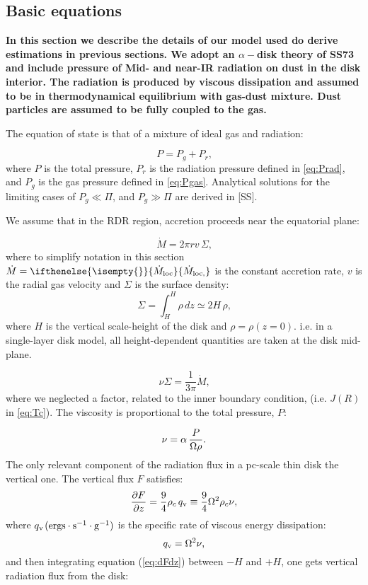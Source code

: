 \documentclass[12pt,english,preprint]{aastex}
\newcommand{\mybf}{\bf}
\newcommand{\su}[2]{#1_{\rm #2}}
\newcommand{\mdt}[1][]{ 
  \ifthenelse{\isempty{#1}}
  {\dot{M}_{\rm loc}}
  { {\dot M}_{\rm{loc},{#1}} } 
  } %
\begin{document}
\subsection{Basic equations}
{\mybf
In this section we describe the details of our model used do derive estimations 
in previous sections. 
We adopt an $\alpha-$disk theory of SS73 and include pressure of Mid- and near-IR radiation on dust in the disk 
interior. The radiation is produced by viscous dissipation and assumed to be in thermodynamical 
equilibrium with gas-dust mixture. Dust particles are assumed to be fully coupled to the gas. 

The equation of state is that of a mixture of ideal gas and radiation:

\begin{equation}
P=P_{g}+P_r\mbox{,}\label{eq:Ptot}
\end{equation}
where $P$ is the total pressure, $P_r$ is the radiation pressure defined 
in \eqref{eq:Prad}, and  $P_{g}$ is the gas pressure defined in \eqref{eq:Pgas}.
Analytical solutions for the
limiting cases of $P_{g}\ll\Pi$, and $P_{g}\gg\Pi$ are derived in
{[}SS{]}.

We assume that in the RDR region, accretion proceeds near the equatorial plane:
}
\begin{equation}
\dot{M}=2\pi rv\,\Sigma\mbox{,}\label{eq:MdotEq}
\end{equation}
where to simplify notation in this section $\dot{M}=\mdt$ is the constant accretion rate, $v$ is the radial
gas velocity and $\Sigma$ is the surface density: 
\begin{equation}
\Sigma=\int_H^H\rho\,dz\simeq2 H\,\rho\mbox{,}\label{eq:SigmaS}
\end{equation}
where $H$ is the vertical scale-height of the disk and $\rho=\rho(z=0)$.
i.e. in a single-layer disk model, all height-dependent quantities are taken at the
disk mid-plane.

\begin{equation}
\nu\Sigma=\frac{1}{3\pi}\dot{M}\mbox{,}\label{eq:AngMom}
\end{equation}
where we neglected a factor, related to the inner boundary condition,
(i.e. $J(R)$ in \eqref{eq:Tc}).
The viscosity is proportional to the total pressure, $P$:

\begin{equation}
  \nu=\alpha\,\frac{P}{\text{\ensuremath{\Omega\rho}}}\mbox{.}
  \label{eq:nuAlphaPtot}    
\end{equation}
The only relevant component of the radiation flux in a pc-scale thin disk
the vertical one. 
The vertical flux $F$ satisfies: 
\begin{equation}
\frac{\partial F}{\partial z}=\frac{9}{4}\rho_c
\,q_{{\rm v}}\equiv\frac{9}{4}\Omega^{2}\rho_c\nu\mbox{,}\label{eq:dFdz}
\end{equation}
where $q_{{\rm v}}$$({\rm ergs\cdot s^{-1}\cdot g^{-1}})$ is the
specific rate of viscous energy dissipation: 
\begin{equation}
\su{q}{v}=\Omega^{2}\nu\mbox{,}\label{eq:qv(specific)}
\end{equation}
and then integrating equation (\ref{eq:dFdz}) between $-H$ and
$+H$, one gets vertical radiation flux from the disk:
\end{document}

